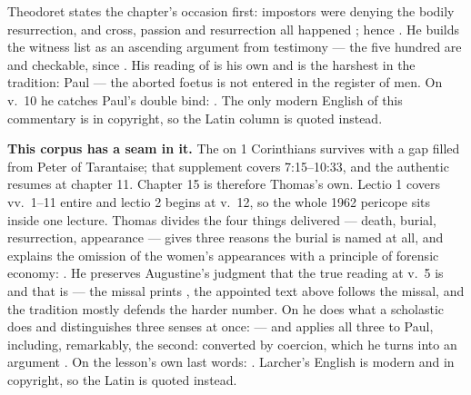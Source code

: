 \begin{witnessnote}
Theodoret states the chapter's occasion first: impostors were denying the
bodily resurrection, and cross, passion and resurrection all happened
; hence . He builds the
witness list as an ascending argument from testimony --- the five hundred are
 and checkable, since . His reading of  is his own and is the harshest in the
tradition: Paul  --- the aborted foetus is not entered in the register of men.
On v.~10 he catches Paul's double bind: . The only modern English of this
commentary is in copyright, so the Latin column is quoted instead.
\end{witnessnote}

\begin{witnessnote}
\textbf{This corpus has a seam in it.} The
 on 1 Corinthians survives with a gap filled from Peter of
Tarantaise; that supplement covers 7:15--10:33, and the authentic
 resumes at chapter 11. Chapter 15 is therefore
Thomas's own. Lectio 1 covers vv.~1--11 entire and lectio 2 begins at v.~12, so
the whole 1962 pericope sits inside one lecture. Thomas divides the four things
delivered --- death, burial, resurrection, appearance --- gives three reasons
the burial is named at all, and explains the omission of the women's
appearances with a principle of forensic economy: . He preserves Augustine's judgment that the true
reading at v.~5 is  and that  is  --- the missal prints , the appointed
text above follows the missal, and the tradition mostly defends the harder
number. On  he does what a scholastic does and
distinguishes three senses at once:  --- and applies all three to Paul, including, remarkably, the
second: converted by coercion, which he turns into an argument
. On the lesson's own last words: . Larcher's English is modern and in copyright, so the Latin
is quoted instead.
\end{witnessnote}

